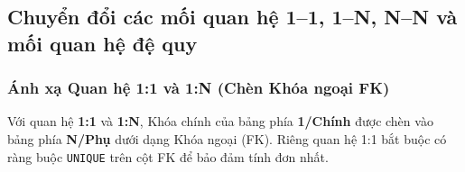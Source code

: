 \renewcommand{\arraystretch}{1.0}
\setlength{\arrayrulewidth}{0.4pt}

\subsection{Chuyển đổi các mối quan hệ 1--1, 1--N, N--N và mối quan hệ đệ quy}
\label{subsec:2_1_3_chuyen_doi_moi_quan_he}

\subsubsection{Ánh xạ Quan hệ 1:1 và 1:N (Chèn Khóa ngoại FK)}

Với quan hệ \textbf{1:1} và \textbf{1:N}, Khóa chính của bảng phía \textbf{1/Chính} được chèn vào bảng phía \textbf{N/Phụ} dưới dạng Khóa ngoại (FK). Riêng quan hệ 1:1 bắt buộc có ràng buộc \texttt{UNIQUE} trên cột FK để bảo đảm tính đơn nhất.

\setlength{\arrayrulewidth}{0.65pt}
\renewcommand{\arraystretch}{1.55}

